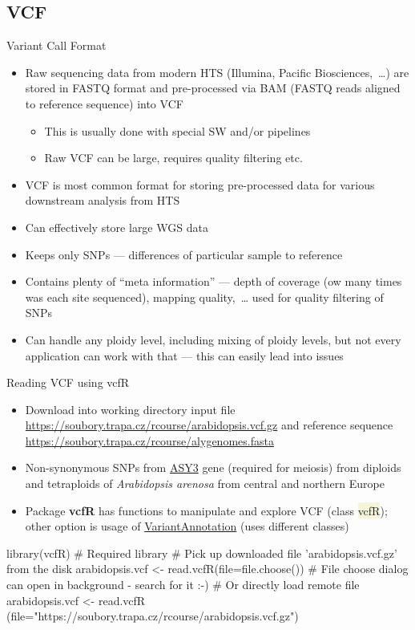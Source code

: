 \documentclass[compress, xelatex, 11pt, xcolor=svgnames, aspectratio=169,
	hyperref={
		bookmarks=true,
		unicode=true,
		colorlinks=true,
		pdftitle={Molecular data in R},
		plainpages=false,
		pdfauthor={Vojtech Zeisek},
		pdfsubject={Course about phylogeny and evolution in R},
		pdfcreator={XeLaTeX},
		pdfkeywords={R, evolution, phylogeny, molecular data},
		linkcolor=Crimson, %
		anchorcolor=Magenta, %
		citecolor=Magenta, %
		filecolor=Magenta, %
		menucolor=Magenta, %
		urlcolor=DodgerBlue, %
		},
	url={hyphens, lowtilde} %
	]{beamer}
\renewcommand{\texttt}[1]{\colorbox{Beige}{{\ttfamily #1}}}
\begin{document}
\subsection{VCF}

\begin{frame}{Variant Call Format}
	\begin{itemize}
		\item Raw sequencing data from modern HTS (Illumina, Pacific Biosciences,~\ldots) are stored in FASTQ format and pre-processed via BAM (FASTQ reads aligned to reference sequence) into VCF
		\begin{itemize}
			\item This is usually done with special SW and/or pipelines
			\item Raw VCF can be large, requires quality filtering etc.
		\end{itemize}
		\item VCF is most common format for storing pre-processed data for various downstream analysis from HTS
		\item Can effectively store large WGS data
		\item Keeps only SNPs --- differences of particular sample to reference
		\item Contains plenty of \enquote{meta information} --- depth of coverage (ow many times was each site sequenced), mapping quality,~\ldots{ }used for quality filtering of SNPs
		\item Can handle any ploidy level, including mixing of ploidy levels, but not every application can work with that --- this can easily lead into issues
	\end{itemize}
\end{frame}

\begin{frame}[fragile]{Reading VCF using vcfR}
	\begin{itemize}
		\item Download into working directory input file \url{https://soubory.trapa.cz/rcourse/arabidopsis.vcf.gz} and reference sequence \url{https://soubory.trapa.cz/rcourse/alygenomes.fasta}
		\item Non-synonymous SNPs from \href{https://www.arabidopsis.org/servlets/TairObject?type=locus&name=At2g46980}{ASY3} gene (required for meiosis) from diploids and tetraploids of \textit{Arabidopsis arenosa} from central and northern Europe
		\item Package \textbf{vcfR} has functions to manipulate and explore VCF (class \texttt{vcfR}); other option is usage of \href{https://bioconductor.org/packages/release/bioc/html/VariantAnnotation.html}{VariantAnnotation} (uses different classes)
	\end{itemize}
	\begin{spluscode}
    library(vcfR) # Required library
    # Pick up downloaded file 'arabidopsis.vcf.gz' from the disk
    arabidopsis.vcf <- read.vcfR(file=file.choose())
    # File choose dialog can open in background - search for it :-)
    # Or directly load remote file
    arabidopsis.vcf <- read.vcfR
      (file="https://soubory.trapa.cz/rcourse/arabidopsis.vcf.gz")
	\end{spluscode}
\end{frame}
\end{document}
